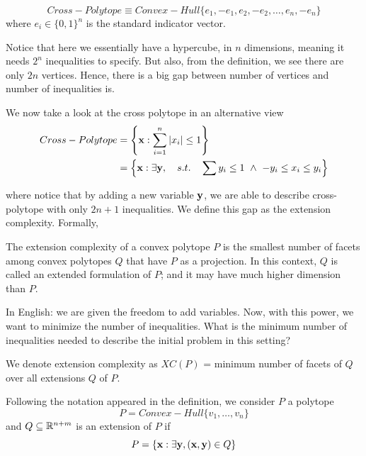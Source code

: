 \begin{definition}
	\begin{equation}
		Cross-Polytope \equiv Convex-Hull \{ e_1, -e_1, e_2, -e_2, \dots, e_n, -e_n \}
	\end{equation}
	where $e_i \in \{0, 1\}^n$ is the standard indicator vector.
\end{definition}

Notice that here we essentially have a hypercube, in $n$ dimensions, meaning it needs $2^n$ inequalities to specify. But also, from the definition, we see there are only $2n$ vertices. Hence, there is a big gap between number of vertices and number of inequalities is. 

We now take a look at the cross polytope in an alternative view
\begin{align}
	Cross-Polytope 
	&= \left\{ \mathbf{x} : \sum_{i = 1}^n |x_i| \leq 1 \right\} \\
	&= \left\{ \mathbf{x} : \exists \mathbf{y}, \quad s.t. \quad
		\sum y_i \leq 1 \,\,\wedge\,\,
		-y_i \leq x_i \leq y_i \right\}
\end{align}

where notice that by adding a new variable $\mathbf{y}$, we are able to describe cross-polytope with only $2n + 1$ inequalities. We define this gap as the extension complexity. Formally, 

\begin{definition}
	The extension complexity of a convex polytope $P$ is the smallest number of facets among convex polytopes $Q$ that have $P$ as a projection. In this context, $Q$ is called an extended formulation of $P$; and it may have much higher dimension than $P$. 
	
	In English: we are given the freedom to add variables. Now, with this power, we want to minimize the number of inequalities. What is the minimum number of inequalities needed to describe the initial problem in this setting? 
	
	We denote extension complexity as $XC(P)$ = minimum number of facets of $Q$ over all extensions $Q$ of $P$. 
\end{definition}

Following the notation appeared in the definition, we consider $P$ a polytope
\begin{equation}
	P = Convex-Hull \{ v_1, \dots, v_n \}
\end{equation}
and $Q \subseteq \mathbb{R}^{n + m}$ is an extension of $P$ if 
\begin{equation}
	P = \{ \mathbf{x} : \exists \mathbf{y}, (\mathbf{x}, \mathbf{y}) \in Q \}
\end{equation} 

